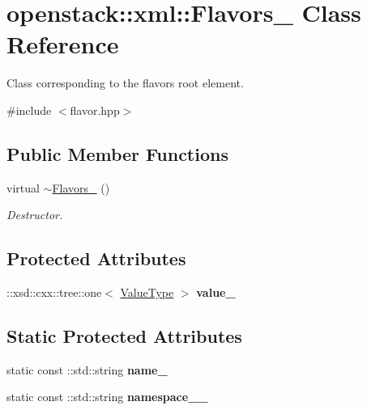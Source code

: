 \hypertarget{classopenstack_1_1xml_1_1Flavors__}{
\section{openstack::xml::Flavors\_\- Class Reference}
\label{classopenstack_1_1xml_1_1Flavors__}
}


Class corresponding to the flavors root element.  




{\ttfamily \#include $<$flavor.hpp$>$}

\subsection*{Public Member Functions}
\begin{DoxyCompactItemize}
\item 
\hypertarget{classopenstack_1_1xml_1_1Flavors___ae4d12bda4200429d5372be9872c8a439}{
virtual \hyperlink{classopenstack_1_1xml_1_1Flavors___ae4d12bda4200429d5372be9872c8a439}{$\sim$Flavors\_\-} ()}
\label{classopenstack_1_1xml_1_1Flavors___ae4d12bda4200429d5372be9872c8a439}

\begin{DoxyCompactList}\small\item\em Destructor. \item\end{DoxyCompactList}\end{DoxyCompactItemize}
\subsection*{Protected Attributes}
\begin{DoxyCompactItemize}
\item 
\hypertarget{classopenstack_1_1xml_1_1Flavors___a3b096186e38e1caab26863ad274b230c}{
::xsd::cxx::tree::one$<$ \hyperlink{classopenstack_1_1xml_1_1Flavors}{ValueType} $>$ {\bfseries value\_\-}}
\label{classopenstack_1_1xml_1_1Flavors___a3b096186e38e1caab26863ad274b230c}

\end{DoxyCompactItemize}
\subsection*{Static Protected Attributes}
\begin{DoxyCompactItemize}
\item 
\hypertarget{classopenstack_1_1xml_1_1Flavors___a609df29bc81494570faf0789d68cf9a4}{
static const ::std::string {\bfseries name\_\-}}
\label{classopenstack_1_1xml_1_1Flavors___a609df29bc81494570faf0789d68cf9a4}

\item 
\hypertarget{classopenstack_1_1xml_1_1Flavors___a19890196aecfb02edb44cf5523129254}{
static const ::std::string {\bfseries namespace\_\-\_\-}}
\label{classopenstack_1_1xml_1_1Flavors___a19890196aecfb02edb44cf5523129254}

\end{DoxyCompactItemize}
